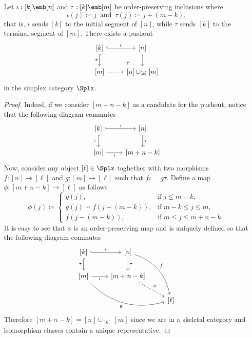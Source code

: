 \begin{lemma}
\label{lem:splx-cat-pushout-injections}
Let \(\iota: [k] \emb [n]\) and \(\tau: [k] \emb [m]\) be order-preserving
inclusions where
\[
\iota(j) \coloneq j\ \text{ and }\ \tau(j) \coloneq j + (m - k),
\]
that is, \(\iota\) sends \([k]\) to the initial segment of \([n]\), while
\(\tau\) sends \([k]\) to the terminal segment of \([m]\). There exists a
pushout
\[
\begin{tikzcd}
{[k]} \ar[r, hook, "\iota"] \ar[d, hook, "\tau"']
\ar[rd, "\ulcorner", very near end, phantom]
&{[n]} \ar[d] \\
{[m]} \ar[r] &{[n] \cup_{[k]} [m]}
\end{tikzcd}
\]
in the simplex category \(\Splx\).
\end{lemma}

\begin{proof}
Indeed, if we consider \([m + n - k]\) as a candidate for the pushout, notice
that the following diagram commutes
\[
\begin{tikzcd}
{[k]} \ar[r, hook, "\iota"] \ar[d, hook, "\tau"']
&{[n]} \ar[d, "\tau"] \\
{[m]} \ar[r, "\iota"'] &{[m + n - k]}
\end{tikzcd}
\]
Now, consider any object \([\ell] \in \Splx\) toghether with two morphisms
\(f: [n] \to [\ell]\) and \(g: [m] \to [\ell]\) such that \(f \iota = g
\tau\). Define a map \(\phi: [m + n - k] \to [\ell]\) as follows
\[
\phi(j) \coloneq
\begin{cases}
  g(j),                  &\text{if } j \leq m - k, \\
  g(j) = f(j - (m - k)), &\text{if } m - k \leq j \leq m, \\
  f(j - (m - k)),        &\text{if } m \leq j \leq m + n - k.
\end{cases}
\]
It is easy to see that \(\phi\) is an order-preserving map and is uniquely
defined so that the following diagram commutes
\[
\begin{tikzcd}
{[k]} \ar[r, hook, "\iota"] \ar[d, hook, "\tau"']
&{[n]} \ar[d, "\tau"] \ar[drd, bend left, "f"] & \\
{[m]} \ar[r, "\iota"'] \ar[rrd, bend right, "g"']
&{[m + n - k]} \ar[rd, dashed, "\phi"] & \\
& &{[\ell]}
\end{tikzcd}
\]
Therefore \([m + n - k] = [n] \cup_{[k]} [m]\) since we are in a skeletal
category and isomorphism classes contain a unique representative.
\end{proof}

